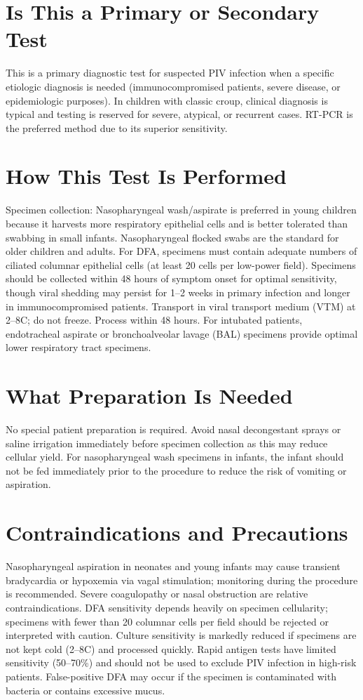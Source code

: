 \section*{Is This a Primary or Secondary Test}
This is a primary diagnostic test for suspected PIV infection when a specific etiologic diagnosis is needed (immunocompromised patients, severe disease, or epidemiologic purposes). In children with classic croup, clinical diagnosis is typical and testing is reserved for severe, atypical, or recurrent cases. RT-PCR is the preferred method due to its superior sensitivity.

\section*{How This Test Is Performed}
Specimen collection: Nasopharyngeal wash/aspirate is preferred in young children because it harvests more respiratory epithelial cells and is better tolerated than swabbing in small infants. Nasopharyngeal flocked swabs are the standard for older children and adults. For DFA, specimens must contain adequate numbers of ciliated columnar epithelial cells (at least 20 cells per low-power field). Specimens should be collected within 48 hours of symptom onset for optimal sensitivity, though viral shedding may persist for 1--2 weeks in primary infection and longer in immunocompromised patients. Transport in viral transport medium (VTM) at 2--8\textdegree{}C; do not freeze. Process within 48 hours. For intubated patients, endotracheal aspirate or bronchoalveolar lavage (BAL) specimens provide optimal lower respiratory tract specimens.

\section*{What Preparation Is Needed}
No special patient preparation is required. Avoid nasal decongestant sprays or saline irrigation immediately before specimen collection as this may reduce cellular yield. For nasopharyngeal wash specimens in infants, the infant should not be fed immediately prior to the procedure to reduce the risk of vomiting or aspiration.

\section*{Contraindications and Precautions}
Nasopharyngeal aspiration in neonates and young infants may cause transient bradycardia or hypoxemia via vagal stimulation; monitoring during the procedure is recommended. Severe coagulopathy or nasal obstruction are relative contraindications. DFA sensitivity depends heavily on specimen cellularity; specimens with fewer than 20 columnar cells per field should be rejected or interpreted with caution. Culture sensitivity is markedly reduced if specimens are not kept cold (2--8\textdegree{}C) and processed quickly. Rapid antigen tests have limited sensitivity (50--70\%) and should not be used to exclude PIV infection in high-risk patients. False-positive DFA may occur if the specimen is contaminated with bacteria or contains excessive mucus.

